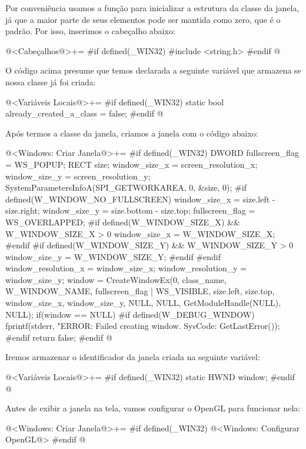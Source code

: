 Por conveniência usamos a função  para inicializar
a estrutura da classe da janela, já que a maior parte de seus
elementos pode ser mantida como zero, que é o padrão. Por isso,
inserimos o cabeçalho abaixo:

\iniciocodigo
@<Cabeçalhos@>+=
#if defined(_WIN32)
#include <string.h>
#endif
@
\fimcodigo

O código acima presume que temos declarada a seguinte variável que
armazena se nossa classe já foi criada:

\iniciocodigo
@<Variáveis Locais@>+=
#if defined(_WIN32)
static bool already_created_a_class = false;
#endif
@
\fimcodigo

Após termos a classe da janela, criamos a janela com o código
abaixo:

\iniciocodigo
@<Windows: Criar Janela@>+=
#if defined(_WIN32)
{
  DWORD fullscreen_flag = WS_POPUP;
  RECT size;
  window_size_x = screen_resolution_x;
  window_size_y = screen_resolution_y;
  SystemParametersInfoA(SPI_GETWORKAREA, 0, &size, 0);
#if defined(W_WINDOW_NO_FULLSCREEN)
  window_size_x = size.left - size.right;
  window_size_y = size.bottom - size.top;
  fullscreen_flag = WS_OVERLAPPED;
#if defined(W_WINDOW_SIZE_X) && W_WINDOW_SIZE_X > 0
  window_size_x = W_WINDOW_SIZE_X;
#endif
#if defined(W_WINDOW_SIZE_Y) && W_WINDOW_SIZE_Y > 0
  window_size_y = W_WINDOW_SIZE_Y;
#endif
#endif
  window_resolution_x = window_size_x;
  window_resolution_y = window_size_y;
  window = CreateWindowEx(0, class_name,
                          W_WINDOW_NAME,
                          fullscreen_flag | WS_VISIBLE,
                          size.left, size.top, window_size_x,
                          window_size_y,
                          NULL, NULL,
                          GetModuleHandle(NULL),
                          NULL);
  if(window == NULL){
#if defined(W_DEBUG_WINDOW)
    fprintf(stderr, "ERROR: Failed creating window. SysCode: %
            GetLastError());
#endif
    return false;
  }
}
#endif
@
\fimcodigo

Iremos armazenar o identificador da janela criada na seguinte
variável:

\iniciocodigo
@<Variáveis Locais@>+=
#if defined(_WIN32)
static HWND window;
#endif
@
\fimcodigo

Antes de exibir a janela na tela, vamos configurar o OpenGL para
funcionar nela:

\iniciocodigo
@<Windows: Criar Janela@>+=
#if defined(_WIN32)
@<Windows: Configurar OpenGL@>
#endif
@
\fimcodigo

